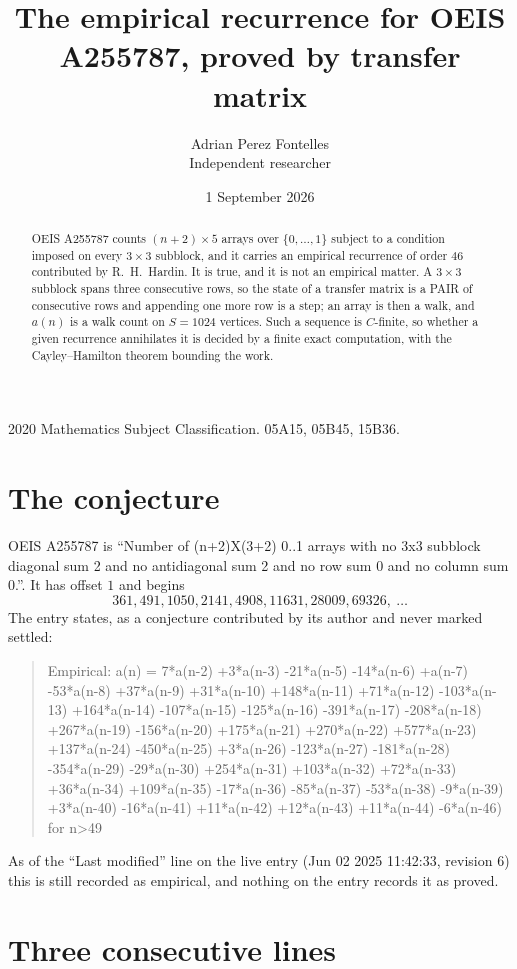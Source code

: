 \documentclass[11pt,a4paper]{article}
\title{The empirical recurrence for OEIS A255787, proved by transfer matrix}
\author{Adrian Perez Fontelles\\ \small Independent researcher}
\date{1 September 2026}
\theoremstyle{plain}
\theoremstyle{definition}
\begin{document}
\maketitle

\begin{abstract}
OEIS A255787 counts $(n+2)\times5$ arrays over $\{0,\dots,1\}$ subject to a condition imposed on
every $3\times3$ subblock, and it carries an empirical recurrence of order $46$
contributed by R.~H.~Hardin. It is true, and it is not an empirical matter. A $3\times3$
subblock spans three consecutive rows, so the state of a transfer matrix is a PAIR of
consecutive rows and appending one more row is a step; an array is then a walk, and
$a(n)$ is a walk count on $S=1024$ vertices. Such a sequence is $C$-finite, so whether a given
recurrence annihilates it is decided by a finite exact computation, with the Cayley--Hamilton
theorem bounding the work.
\end{abstract}

\noindent\small 2020 Mathematics Subject Classification. 05A15, 05B45, 15B36.\normalsize

\section{The conjecture}

OEIS A255787 is ``Number of (n+2)X(3+2) 0..1 arrays with no 3x3 subblock diagonal sum 2 and no antidiagonal sum 2 and no row sum 0 and no column sum 0.''. It has offset $1$ and begins
\[
361, 491, 1050, 2141, 4908, 11631, 28009, 69326,\ \dots
\]
The entry states, as a conjecture contributed by its author and never marked settled:
\begin{quote}
Empirical: a(n) = 7*a(n-2) +3*a(n-3) -21*a(n-5) -14*a(n-6) +a(n-7) -53*a(n-8) +37*a(n-9) +31*a(n-10) +148*a(n-11) +71*a(n-12) -103*a(n-13) +164*a(n-14) -107*a(n-15) -125*a(n-16) -391*a(n-17) -208*a(n-18) +267*a(n-19) -156*a(n-20) +175*a(n-21) +270*a(n-22) +577*a(n-23) +137*a(n-24) -450*a(n-25) +3*a(n-26) -123*a(n-27) -181*a(n-28) -354*a(n-29) -29*a(n-30) +254*a(n-31) +103*a(n-32) +72*a(n-33) +36*a(n-34) +109*a(n-35) -17*a(n-36) -85*a(n-37) -53*a(n-38) -9*a(n-39) +3*a(n-40) -16*a(n-41) +11*a(n-42) +12*a(n-43) +11*a(n-44) -6*a(n-46) for n>49
\end{quote}
As of the ``Last modified'' line on the live entry (Jun 02 2025 11:42:33, revision 6) this is still
recorded as empirical, and nothing on the entry records it as proved.

\section{Three consecutive lines}
\end{document}
